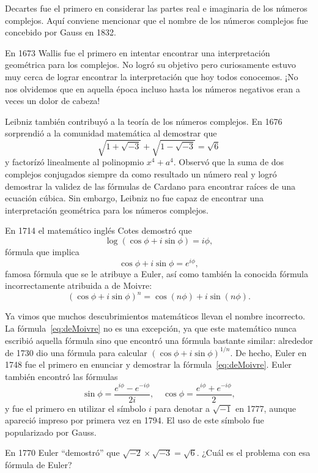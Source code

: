 Decartes fue el primero en considerar las partes real e imaginaria de los
números complejos. Aquí conviene mencionar que el nombre de los números
complejos fue concebido por Gauss en 1832. 

En 1673 Wallis fue el primero en intentar encontrar una interpretación
geométrica para los complejos. No logró su objetivo pero curiosamente estuvo
muy cerca de lograr encontrar la interpretación que hoy todos conocemos. ¡No
nos olvidemos que en aquella época incluso hasta los números negativos eran a
veces un dolor de cabeza!

Leibniz también contribuyó a la teoría de los números complejos. En 1676
sorprendió a la comunidad matemática al demostrar que
\[
	\sqrt{1+\sqrt{-3}}+\sqrt{1-\sqrt{-3}}=\sqrt{6}
\]
y factorízó linealmente al polinopmio $x^4+a^4$.  Observó que la suma de dos
complejos conjugados siempre da como resultado un número real y logró demostrar
la validez de las fórmulas de Cardano para encontrar raíces de una ecuación
cúbica.  Sin embargo, Leibniz no fue capaz de encontrar una interpretación
geométrica para los números complejos. 

En 1714 el matemático inglés Cotes demostró que
\[
	\log(\cos\phi+i\sin\phi)=i\phi,
\]
fórmula que implica 
\[
	\cos\phi+i\sin\phi=e^{i\phi},
\]
famosa fórmula que se le atribuye a Euler, así como también la conocida fórmula
incorrectamente atribuida a de Moivre:
\begin{equation}
	\label{eq:deMoivre}
	(\cos\phi+i\sin\phi)^n=\cos(n\phi)+i\sin(n\phi).
\end{equation}

Ya vimos que muchos descubrimientos matemáticos llevan el nombre incorrecto. La
fórmula~\eqref{eq:deMoivre} no es una excepción, ya que este matemático nunca
escribió aquella fórmula sino que encontró una fórmula bastante similar:
alrededor de 1730 dio una fórmula para calcular $(\cos\phi+i\sin\phi)^{1/n}$.
De hecho, 
Euler en 1748 fue el primero en enunciar y demostrar la
fórmula~\eqref{eq:deMoivre}. Euler también encontró las fórmulas
\[
	\sin\phi=\frac{e^{i\phi}-e^{-i\phi}}{2i},\quad
	\cos\phi=\frac{e^{i\phi}+e^{-i\phi}}{2},
\]
y fue el primero en utilizar el símbolo $i$ para denotar a $\sqrt{-1}$ en 1777,
aunque apareció impreso por primera vez en 1794. El uso de este símbolo fue
popularizado por Gauss.

\begin{exercise}
	En 1770 Euler ``demostró'' que $\sqrt{-2}\times\sqrt{-3}=\sqrt{6}$. ¿Cuál
	es el problema con esa fórmula de Euler?
\end{exercise}

